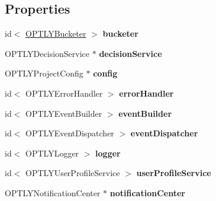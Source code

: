 \subsection*{Properties}
\begin{DoxyCompactItemize}
\item 
\mbox{\label{interface_optimizely_ab2fa0e0e6e3508512e3ac1f0b7830df0}} 
id$<$ \mbox{\hyperlink{interface_o_p_t_l_y_bucketer}{O\+P\+T\+L\+Y\+Bucketer}} $>$ {\bfseries bucketer}
\item 
\mbox{\label{interface_optimizely_ad55471f26d95ba25e98293161cf32b04}} 
O\+P\+T\+L\+Y\+Decision\+Service $\ast$ {\bfseries decision\+Service}
\item 
\mbox{\label{interface_optimizely_ad7b66955e3671a88243230296fb2a64f}} 
O\+P\+T\+L\+Y\+Project\+Config $\ast$ {\bfseries config}
\item 
\mbox{\label{interface_optimizely_a18617a3176caa057ffa6d7a3cf0b1c48}} 
id$<$ O\+P\+T\+L\+Y\+Error\+Handler $>$ {\bfseries error\+Handler}
\item 
\mbox{\label{interface_optimizely_a60bc1f37b132b4c30e95288baea2b8d3}} 
id$<$ O\+P\+T\+L\+Y\+Event\+Builder $>$ {\bfseries event\+Builder}
\item 
\mbox{\label{interface_optimizely_af75d59ef122a9d4a0b480445ba5061ac}} 
id$<$ O\+P\+T\+L\+Y\+Event\+Dispatcher $>$ {\bfseries event\+Dispatcher}
\item 
\mbox{\label{interface_optimizely_a7e01da650635386d48ca825fcc8cd207}} 
id$<$ O\+P\+T\+L\+Y\+Logger $>$ {\bfseries logger}
\item 
\mbox{\label{interface_optimizely_a97c4d344863bbb0e10d6f127e684140b}} 
id$<$ O\+P\+T\+L\+Y\+User\+Profile\+Service $>$ {\bfseries user\+Profile\+Service}
\item 
\mbox{\label{interface_optimizely_a02a4a3b420ad898203e886106e5883d4}} 
O\+P\+T\+L\+Y\+Notification\+Center $\ast$ {\bfseries notification\+Center}
\end{DoxyCompactItemize}


